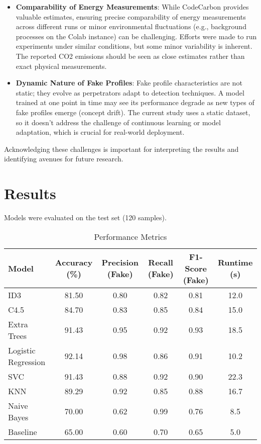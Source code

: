 \documentclass[conference]{IEEEtran}
\begin{document}
\begin{itemize}
    \item \textbf{Comparability of Energy Measurements}: While CodeCarbon provides valuable estimates, ensuring precise comparability of energy measurements across different runs or minor environmental fluctuations (e.g., background processes on the Colab instance) can be challenging. Efforts were made to run experiments under similar conditions, but some minor variability is inherent. The reported CO2 emissions should be seen as close estimates rather than exact physical measurements.
    \item \textbf{Dynamic Nature of Fake Profiles}: Fake profile characteristics are not static; they evolve as perpetrators adapt to detection techniques. A model trained at one point in time may see its performance degrade as new types of fake profiles emerge (concept drift). The current study uses a static dataset, so it doesn't address the challenge of continuous learning or model adaptation, which is crucial for real-world deployment.
\end{itemize}
Acknowledging these challenges is important for interpreting the results and identifying avenues for future research.

\section{Results}
\label{sec:results}
Models were evaluated on the test set (120 samples).

\begin{table*}[htbp]
\caption{Performance Metrics}
\begin{center}
\begin{tabular}{|l|c|c|c|c|c|}
\hline
\textbf{Model} & \textbf{Accuracy (\%)} & \textbf{Precision (Fake)} & \textbf{Recall (Fake)} & \textbf{F1-Score (Fake)} & \textbf{Runtime (s)} \\
\hline
ID3 & 81.50 & 0.80 & 0.82 & 0.81 & 12.0 \\
C4.5 & 84.70 & 0.83 & 0.85 & 0.84 & 15.0 \\
Extra Trees & 91.43 & 0.95 & 0.92 & 0.93 & 18.5 \\
Logistic Regression & 92.14 & 0.98 & 0.86 & 0.91 & 10.2 \\
SVC & 91.43 & 0.88 & 0.92 & 0.90 & 22.3 \\
KNN & 89.29 & 0.92 & 0.85 & 0.88 & 16.7 \\
Naive Bayes & 70.00 & 0.62 & 0.99 & 0.76 & 8.5 \\
Baseline & 65.00 & 0.60 & 0.70 & 0.65 & 5.0 \\
\hline
\end{tabular}
\label{tab:perf}
\end{center}
\end{table*}
\end{document}
